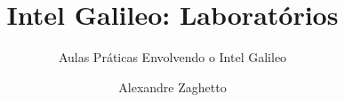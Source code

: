 \documentclass[graybox,envcountchap,sectrefs]{svmono}
\begin{document}
\author{Alexandre Zaghetto}
\title{Intel Galileo: Laboratórios}
\subtitle{Aulas Práticas Envolvendo o Intel Galileo}
\maketitle

\frontmatter%






\tableofcontents




\mainmatter%





\backmatter%


\printindex

\end{document}
